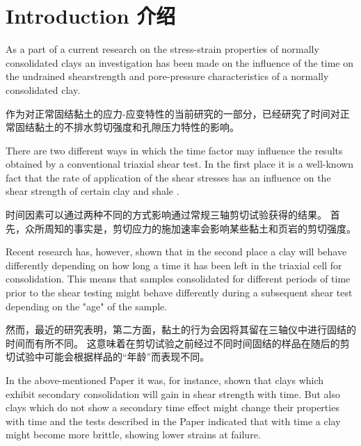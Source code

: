 \section{Introduction 介绍}

\begin{paracol}{2}

    As a part of a current research on the stress-strain properties of normally consolidated clays an investigation has been made on the influence of the time on the undrained shearstrength and pore-pressure characteristics of a normally consolidated clay.

    \switchcolumn

    作为对正常固结黏土的应力-应变特性的当前研究的一部分，已经研究了时间对正常固结黏土的不排水剪切强度和孔隙压力特性的影响。

    \switchcolumn*

    There are two different ways in which the time factor may influence the results obtained by a conventional triaxial shear test. In the first place it is a well-known fact that the rate of application of the shear stresses has an influence on the shear strength of certain clay and shale \citep{Casacrande1951}.

    \switchcolumn
        
    时间因素可以通过两种不同的方式影响通过常规三轴剪切试验获得的结果。 首先，众所周知的事实是，剪切应力的施加速率会影响某些黏土和页岩的剪切强度\citep{Casacrande1951}。

    \switchcolumn*
    
    Recent research \citep{Bjerrum1958148} has, however, shown that in the second place a clay will behave differently depending on how long a time it has been left in the triaxial cell for consolidation. This means that samples consolidated for different periods of time prior to the shear testing might behave differently during a subsequent shear test depending on the "age" of the sample.

    \switchcolumn
            
    然而，最近的研究\citep{Bjerrum1958148}表明，第二方面，黏土的行为会因将其留在三轴仪中进行固结的时间而有所不同。 这意味着在剪切试验之前经过不同时间固结的样品在随后的剪切试验中可能会根据样品的“年龄”而表现不同。

    \switchcolumn*

    In the above-mentioned Paper it was, for instance, shown that clays which exhibit secondary consolidation will gain in shear strength with time. But also clays which do not show a secondary time effect might change their properties with time and the tests described in the Paper indicated that with time a clay might become more brittle, showing lower strains at failure.


\end{paracol}
